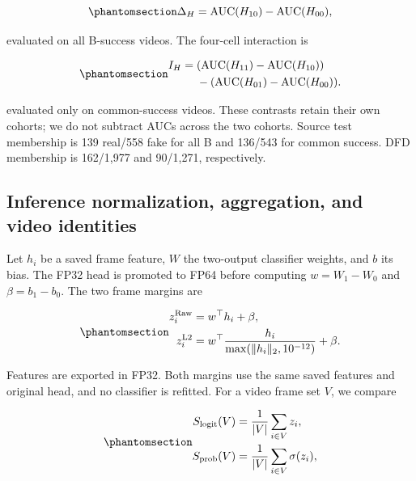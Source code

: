 \documentclass{ieeeaccess}
\begin{document}
\begin{equation}\protect\phantomsection\label{eq-fixed-b}{
\Delta_H=\operatorname{AUC}(H_{10})-\operatorname{AUC}(H_{00}),
}\end{equation}

evaluated on all B-success videos. The four-cell interaction is

\begin{equation}\protect\phantomsection\label{eq-history-interaction}{
\begin{aligned}
I_H={}&(\operatorname{AUC}(H_{11})-\operatorname{AUC}(H_{10}))\\
&-(\operatorname{AUC}(H_{01})-\operatorname{AUC}(H_{00})).
\end{aligned}
}\end{equation}

evaluated only on common-success videos. These contrasts retain their
own cohorts; we do not subtract AUCs across the two cohorts. Source test
membership is 139 real/558 fake for all B and 136/543 for common
success. DFD membership is 162/1,977 and 90/1,271, respectively.

\subsection{Inference normalization, aggregation, and video
identities}\label{inference-normalization-aggregation-and-video-identities}

Let \(h_i\) be a saved frame feature, \(W\) the two-output classifier
weights, and \(b\) its bias. The FP32 head is promoted to FP64 before
computing \(w=W_1-W_0\) and \(\beta=b_1-b_0\). The two frame margins are

\begin{equation}\protect\phantomsection\label{eq-margins}{
\begin{aligned}
z_i^{\mathrm{Raw}}&=w^\top h_i+\beta,\\
z_i^{\mathrm{L2}}&=w^\top\frac{h_i}{\max(\lVert h_i\rVert_2,10^{-12})}+\beta.
\end{aligned}
}\end{equation}

Features are exported in FP32. Both margins use the same saved features
and original head, and no classifier is refitted. For a video frame set
\(V\), we compare

\begin{equation}\protect\phantomsection\label{eq-aggregation}{
\begin{aligned}
S_{\mathrm{logit}}(V)&=\frac{1}{|V|}\sum_{i\in V}z_i,\\
S_{\mathrm{prob}}(V)&=\frac{1}{|V|}\sum_{i\in V}\sigma(z_i),
\end{aligned}
}\end{equation}
\end{document}
